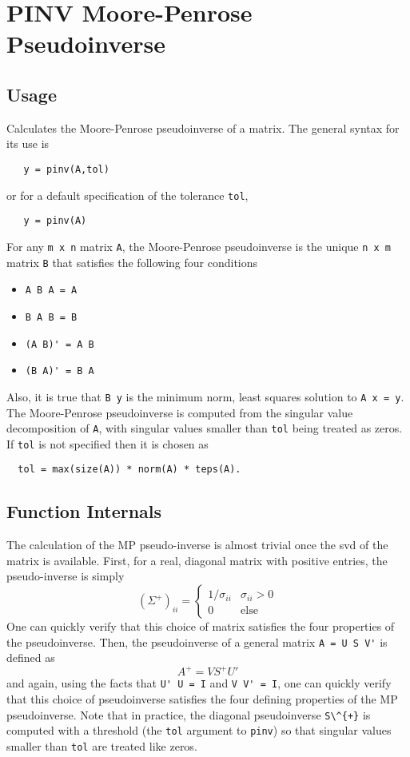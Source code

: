 \section{PINV Moore-Penrose Pseudoinverse}

\subsection{Usage}

Calculates the Moore-Penrose pseudoinverse of a matrix.
The general syntax for its use is
\begin{verbatim}
   y = pinv(A,tol)
\end{verbatim}
or for a default specification of the tolerance \verb|tol|,
\begin{verbatim}
   y = pinv(A)
\end{verbatim}
For any \verb|m x n| matrix \verb|A|, the Moore-Penrose pseudoinverse
is the unique \verb|n x m| matrix \verb|B| that satisfies the following
four conditions
\begin{itemize}
\item  \verb|A B A = A|

\item  \verb|B A B = B|

\item  \verb|(A B)' = A B|

\item  \verb|(B A)' = B A|

\end{itemize}
Also, it is true that \verb|B y| is the minimum norm, least squares
solution to \verb|A x = y|.  The Moore-Penrose pseudoinverse is computed
from the singular value decomposition of \verb|A|, with singular values
smaller than \verb|tol| being treated as zeros.  If \verb|tol| is not specified
then it is chosen as
\begin{verbatim}
  tol = max(size(A)) * norm(A) * teps(A).
\end{verbatim}
\subsection{Function Internals}

The calculation of the MP pseudo-inverse is almost trivial once the
svd of the matrix is available.  First, for a real, diagonal matrix
with positive entries, the pseudo-inverse is simply
\[
  \left(\Sigma^{+}\right)_{ii} = \begin{cases}
             1/\sigma_{ii} & \sigma_{ii} > 0 \\
             0             & \mathrm{else} \end{cases}
\]
One can quickly verify that this choice of matrix satisfies the
four properties of the pseudoinverse.  Then, the pseudoinverse
of a general matrix \verb|A = U S V'| is defined as
\[
   A^{+} = V S^{+} U'
\]
and again, using the facts that \verb|U' U = I| and \verb|V V' = I|, one
can quickly verify that this choice of pseudoinverse satisfies the
four defining properties of the MP pseudoinverse.  Note that in
practice, the diagonal pseudoinverse \verb|S\^{+}| is computed with
a threshold (the \verb|tol| argument to \verb|pinv|) so that singular
values smaller than \verb|tol| are treated like zeros.
